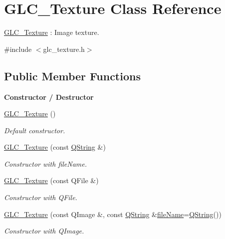 \hypertarget{class_g_l_c___texture}{\section{G\-L\-C\-\_\-\-Texture Class Reference}
\label{class_g_l_c___texture}
}


\hyperlink{class_g_l_c___texture}{G\-L\-C\-\_\-\-Texture} \-: Image texture.  




{\ttfamily \#include $<$glc\-\_\-texture.\-h$>$}

\subsection*{Public Member Functions}
\begin{Indent}{\bf Constructor / Destructor}\par
\begin{DoxyCompactItemize}
\item 
\hyperlink{class_g_l_c___texture_a250a1a2f3b1bfc8e7c65095506cb2adb}{G\-L\-C\-\_\-\-Texture} ()
\begin{DoxyCompactList}\small\item\em Default constructor. \end{DoxyCompactList}\item 
\hyperlink{class_g_l_c___texture_af68a0fe0646130d355ad5e850bb68a40}{G\-L\-C\-\_\-\-Texture} (const \hyperlink{group___u_a_v_objects_plugin_gab9d252f49c333c94a72f97ce3105a32d}{Q\-String} \&)
\begin{DoxyCompactList}\small\item\em Constructor with file\-Name. \end{DoxyCompactList}\item 
\hyperlink{class_g_l_c___texture_ab2087c7ead978763880712ce3f665939}{G\-L\-C\-\_\-\-Texture} (const Q\-File \&)
\begin{DoxyCompactList}\small\item\em Constructor with Q\-File. \end{DoxyCompactList}\item 
\hyperlink{class_g_l_c___texture_a7d0d3a77074e7d793735232c15392ea5}{G\-L\-C\-\_\-\-Texture} (const Q\-Image \&, const \hyperlink{group___u_a_v_objects_plugin_gab9d252f49c333c94a72f97ce3105a32d}{Q\-String} \&\hyperlink{class_g_l_c___texture_acc10491a7ab8a8072820657633d41dea}{file\-Name}=\hyperlink{group___u_a_v_objects_plugin_gab9d252f49c333c94a72f97ce3105a32d}{Q\-String}())
\begin{DoxyCompactList}\small\item\em Constructor with Q\-Image. \end{DoxyCompactList}\item 

\end{DoxyCompactItemize}
\end{Indent}
